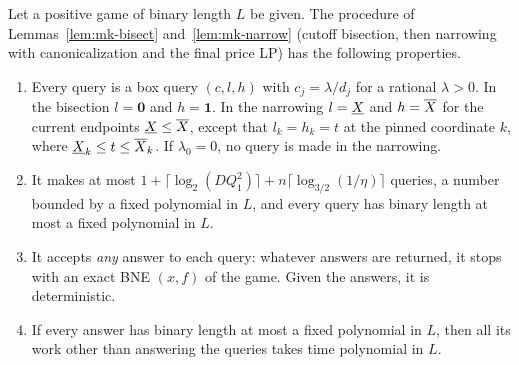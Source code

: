 \begin{lemma}\label{lem:sxm-interface}
Let a positive game of binary length $L$ be given. The procedure of Lemmas~\ref{lem:mk-bisect}
and~\ref{lem:mk-narrow} (cutoff bisection, then narrowing with canonicalization and the final price LP)
has the following properties.
\begin{enumerate}[nosep,label=(\alph*)]
\item Every query is a box query $(c,l,h)$ with $c_j=\lambda/d_j$ for a rational $\lambda>0$. In the
bisection $l=\mathbf0$ and $h=\mathbf1$. In the narrowing $l=\underline{X}$ and $h=\overline{X}$ for the current endpoints
$\underline{X}\le\overline{X}$, except that $l_k=h_k=t$ at the pinned coordinate $k$, where $\underline{X}_k\le t\le\overline{X}_k$. If
$\lambda_0=0$, no query is made in the narrowing.
\item It makes at most $1+\lceil\log_2(DQ_1^2)\rceil+n\lceil\log_{3/2}(1/\eta)\rceil$ queries, a number
bounded by a fixed polynomial in $L$, and every query has binary length at most a fixed polynomial in
$L$.
\item It accepts \emph{any} answer to each query: whatever answers are returned, it stops with an exact
BNE $(x,f)$ of the game. Given the answers, it is deterministic.
\item If every answer has binary length at most a fixed polynomial in $L$, then all its work other than
answering the queries takes time polynomial in $L$.
\end{enumerate}
\end{lemma}

